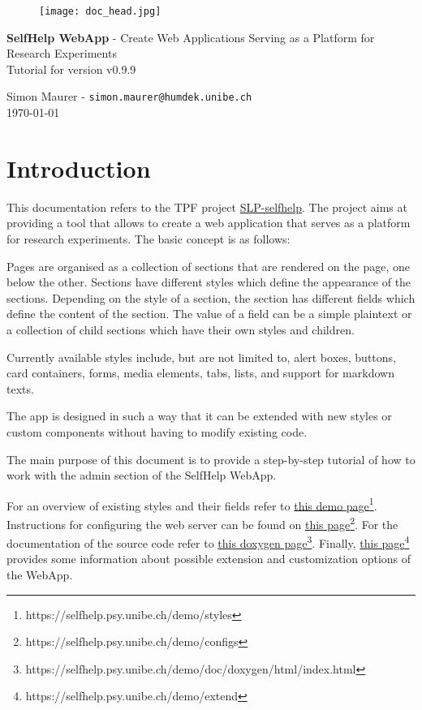 \documentclass[a4paper,oneside]{book}
\begin{document}
\begin{figure}[h]
  \texttt{[image: doc\_head.jpg]}
\end{figure}

\parindent=0pt
\parskip=0.25cm

\begin{center}
\fontsize{20}{21}\selectfont

\textbf{SelfHelp WebApp} - Create Web Applications Serving as a Platform for Research Experiments\\
\vskip 6mm
Tutorial for version v0.9.9
\vskip 6mm

\fontsize{13}{14}\selectfont
Simon Maurer - \texttt{simon.maurer@humdek.unibe.ch}\\
\today
\end{center}

\tableofcontents

\chapter{Introduction}\label{sec.intro}

This documentation refers to the TPF project \href{http://phhum-g111-nns.unibe.ch:10012/SLP/SLP-sleep_coach}{SLP-selfhelp}.
The project aims at providing a tool that allows to create a web application that serves as a platform for research experiments.
The basic concept is as follows:

Pages are organised as a collection of sections that are rendered on the page, one below the other.
Sections have different styles which define the appearance of the sections.
Depending on the style of a section, the section has different fields which define the content of the section.
The value of a field can be a simple plaintext or a collection of child sections which have their own styles and children.

Currently available styles include, but are not limited to, alert boxes, buttons, card containers, forms, media elements, tabs, lists, and support for markdown texts.

The app is designed in such a way that it can be extended with new styles or custom components without having to modify existing code.

The main purpose of this document is to provide a step-by-step tutorial of how to work with the admin section of the SelfHelp WebApp.

For an overview of existing styles and their fields refer to \href{https://selfhelp.psy.unibe.ch/demo/styles}{this demo page}\footnote{https://selfhelp.psy.unibe.ch/demo/styles}.
Instructions for configuring the web server can be found on \href{https://selfhelp.psy.unibe.ch/demo/configs}{this page}\footnote{https://selfhelp.psy.unibe.ch/demo/configs}.
For the documentation of the source code refer to \href{https://selfhelp.psy.unibe.ch/demo/doc/doxygen/html/index.html}{this doxygen page}\footnote{https://selfhelp.psy.unibe.ch/demo/doc/doxygen/html/index.html}.
Finally, \href{https://selfhelp.psy.unibe.ch/demo/extend}{this page}\footnote{https://selfhelp.psy.unibe.ch/demo/extend} provides some information about possible extension and customization options of the WebApp.
\end{document}
